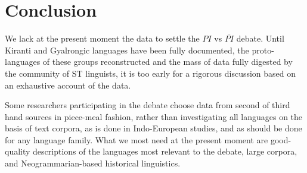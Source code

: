 \documentclass[oldfontcommands,oneside,a4paper,11pt]{article}
\begin{document}
\section{Conclusion}

We lack at the present moment the data to settle the $PI$ vs $\overline{PI}$ debate. Until Kiranti and Gyalrongic languages have been fully documented, the proto-languages of these groups reconstructed and the mass of data fully digested by the community of ST linguists, it is too early for a rigorous discussion based on an exhaustive account of the data. 

Some researchers participating in the debate choose data from second of third hand sources in piece-meal fashion, rather than investigating all languages on the basis of text corpora, as is done in Indo-European studies, and as should be done for any language family. What we most need at the present moment are good-quality descriptions of the languages most relevant to the debate, large corpora, and Neogrammarian-based historical linguistics.



\end{document}
